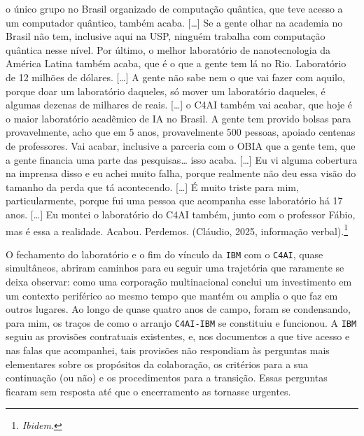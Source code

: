\begin{citacaoabnt}
[\ldots{}] o único grupo no Brasil organizado de computação quântica, que teve acesso a um computador quântico, também acaba. [\ldots{}] Se a gente olhar na academia no Brasil não tem, inclusive aqui na USP, ninguém trabalha com computação quântica nesse nível. Por último, o melhor laboratório de nanotecnologia da América Latina também acaba, que é o que a gente tem lá no Rio. Laboratório de 12 milhões de dólares. [\ldots{}] A gente não sabe nem o que vai fazer com aquilo, porque doar um laboratório daqueles, só mover um laboratório daqueles, é algumas dezenas de milhares de reais. [\ldots{}] o C4AI também vai acabar, que hoje é o maior laboratório acadêmico de IA no Brasil. A gente tem provido bolsas para provavelmente, acho que em 5 anos, provavelmente 500 pessoas, apoiado centenas de professores. Vai acabar, inclusive a parceria com o OBIA que a gente tem, que a gente financia uma parte das pesquisas\ldots{} isso acaba. [\ldots{}] Eu vi alguma cobertura na imprensa disso e eu achei muito falha, porque realmente não deu essa visão do tamanho da perda que tá acontecendo. [\ldots{}] É muito triste para mim, particularmente, porque fui uma pessoa que acompanha esse laboratório há 17 anos. [\ldots{}] Eu montei o laboratório do C4AI também, junto com o professor Fábio, mas é essa a realidade. Acabou. Perdemos. (Cláudio, 2025, informação verbal).\footnote{\textit{Ibidem}.}
\end{citacaoabnt}

O fechamento do laboratório e o fim do vínculo da \texttt{IBM} com o \texttt{C4AI}, quase simultâneos, abriram caminhos para eu seguir uma trajetória que raramente se deixa observar: como uma corporação multinacional conclui um investimento em um contexto periférico ao mesmo tempo que mantém ou amplia o que faz em outros lugares. Ao longo de quase quatro anos de campo, foram se condensando, para mim, os traços de como o arranjo \texttt{C4AI-IBM} se constituiu e funcionou. A \texttt{IBM} seguiu as provisões contratuais existentes, e, nos documentos a que tive acesso e nas falas que acompanhei, tais provisões não respondiam às perguntas mais elementares sobre os propósitos da colaboração, os critérios para a sua continuação (ou não) e os procedimentos para a transição. Essas perguntas ficaram sem resposta até que o encerramento as tornasse urgentes. %

